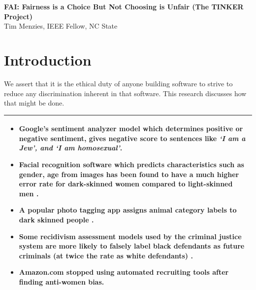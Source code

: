 \documentclass{NSF}
\newcommand{\TITLE}{FAI:  Fairness is a Choice But Not
Choosing is Unfair (The TINKER Project)}
\begin{document}
\begin{nsfdescription}
\thispagestyle{plain}
 \begin{center}
{\bf \TITLE}\\
{Tim Menzies,  IEEE Fellow,  NC State}
 \end{center}


 

 \section{Introduction}\label{tion:intro}
We assert that it is the ethical duty of anyone building
software   to strive to reduce any discrimination inherent in that software. This research discusses how that might be done.



\begin{table}
\begin{tabular}{|p{3in}|}\hline
\rowcolor{gray!20}\small
\begin{itemize}[leftmargin=*]
\item
Google's sentiment analyzer model  which determines positive or negative sentiment, gives negative score to   sentences like \textit{`I am a Jew', and `I am homosexual'}\cite{Google_Sentiment}. 
\item
Facial recognition software which predicts characteristics such as gender, age from images has been
found to have a much higher error rate for dark-skinned women compared to light-skinned men \cite{Gender_Bias}. 
\item
A popular photo tagging app   assigns animal category labels to dark skinned people \cite{Google_Photo}. 
\item 
Some recidivism assessment models used by the criminal justice system         are more likely to falsely label black defendants as future criminals (at  twice the rate as white defendants) \cite{Machine_Bias}. 
\item
Amazon.com stopped using automated  recruiting tools after finding anti-women bias\cite{Amazon_Bias}. 
\end{itemize}\\\hline

\end{tabular}
\end{table}
\end{nsfdescription}
\end{document}

